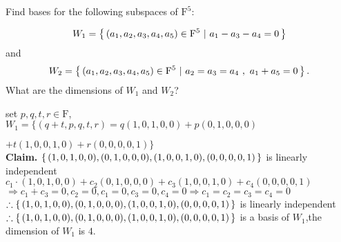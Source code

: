 Find bases for the following subspaces of $\mathrm{F}^5$:

$$ W_1 = \left\{ \,(a_1,a_2,a_3,a_4,a_5) \in \mathrm{F}^5 ~|~ a_1 - a_3 - a_4 = 0 \,\right\} $$
and
$$ W_2 = \left\{ \,(a_1,a_2,a_3,a_4,a_5) \in \mathrm{F}^5 ~|~ a_2 = a_3 = a_4 ~,~ a_1 + a_5 = 0 \,\right\}. $$
What are the dimensions of $W_1$ and $W_2$?


\begin{tcolorbox}
	\begin{solution}
		set $p,q,t,r \in \mathrm{F}$,\\$W_1 = \{(q+t,p,q,t,r) = q(1,0,1,0,0)+ p(0,1,0,0,0) $
		
		$ + t(1,0,0,1,0) + r(0,0,0,0,1)\}$\\
		\textbf{Claim.} $\left\{ \,(1,0,1,0,0),(0,1,0,0,0),(1,0,0,1,0),(0,0,0,0,1) \,\right\}$ is linearly independent\\
		$c_1\cdot(1,0,1,0,0) + c_2(0,1,0,0,0) + c_3(1,0,0,1,0)+c_4(0,0,0,0,1)$\\
		$\Rightarrow c_1+c_3=0, c_2 = 0, c_1 = 0, c_3 = 0, c_4 = 0 \Rightarrow c_1=c_2=c_3=c_4=0$\\
		$\therefore \left\{ \,(1,0,1,0,0),(0,1,0,0,0),(1,0,0,1,0),(0,0,0,0,1) \,\right\}$ is linearly independent\\
		$\therefore \left\{ \,(1,0,1,0,0),(0,1,0,0,0),(1,0,0,1,0),(0,0,0,0,1) \,\right\}$ is a basis of $W_1$,the dimension of $W_1$ is $4$.
	\end{solution}
\end{tcolorbox}